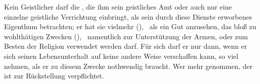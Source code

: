\begin{aufza}
\item Kein Geistlicher darf die , die ihm sein geistliches Amt oder auch nur eine einzelne geistliche Verrichtung einbringt, als sein durch diese Dienste erworbenes Eigenthum betrachten; er hat sie vielmehr  (), \dh\  als ein Gut anzusehen, das bloß zu wohlthätigen Zwecken (), \zB\  namentlich zur Unterstützung der Armen, oder zum Besten der Religion verwendet werden darf. Für sich darf er nur dann, wenn er sich seinen Lebensunterhalt auf keine andere Weise verschaffen kann, so viel nehmen, als er zu diesem Zwecke nothwendig braucht. Wer mehr genommen, der ist zur Rückstellung verpflichtet.
\end{aufza}

